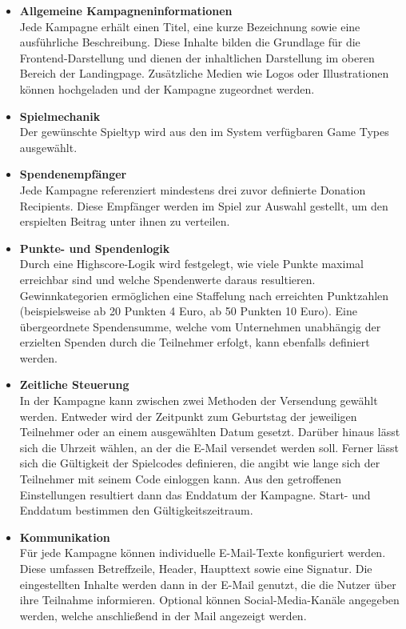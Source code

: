 \begin{itemize}
\item \textbf{Allgemeine Kampagneninformationen} \\
Jede Kampagne erhält einen Titel, eine kurze Bezeichnung sowie eine ausführliche Beschreibung.
Diese Inhalte bilden die Grundlage für die Frontend-Darstellung und dienen der inhaltlichen Darstellung im oberen Bereich der Landingpage.
Zusätzliche Medien wie Logos oder Illustrationen können hochgeladen und der Kampagne zugeordnet werden.

\item \textbf{Spielmechanik} \\
Der gewünschte Spieltyp wird aus den im System verfügbaren Game Types ausgewählt.

\item \textbf{Spendenempfänger} \\
Jede Kampagne referenziert mindestens drei zuvor definierte Donation Recipients.
Diese Empfänger werden im Spiel zur Auswahl gestellt, um den erspielten Beitrag unter ihnen zu verteilen.

\item \textbf{Punkte- und Spendenlogik} \\
Durch eine Highscore-Logik wird festgelegt, wie viele Punkte maximal erreichbar sind und welche Spendenwerte daraus resultieren.
Gewinnkategorien ermöglichen eine Staffelung nach erreichten Punktzahlen (beispielsweise ab 20 Punkten 4 Euro, ab 50 Punkten 10 Euro).
Eine übergeordnete Spendensumme, welche vom Unternehmen unabhängig der erzielten Spenden durch die Teilnehmer erfolgt, kann ebenfalls definiert werden.

\item \textbf{Zeitliche Steuerung} \\
In der Kampagne kann zwischen zwei Methoden der Versendung gewählt werden.
Entweder wird der Zeitpunkt zum Geburtstag der jeweiligen Teilnehmer oder an einem ausgewählten Datum gesetzt.
Darüber hinaus lässt sich die Uhrzeit wählen, an der die E-Mail versendet werden soll.
Ferner lässt sich die Gültigkeit der Spielcodes definieren, die angibt wie lange sich der Teilnehmer mit seinem Code einloggen kann.
Aus den getroffenen Einstellungen resultiert dann das Enddatum der Kampagne.
Start- und Enddatum bestimmen den Gültigkeitszeitraum.

\item \textbf{Kommunikation} \\
Für jede Kampagne können individuelle E-Mail-Texte konfiguriert werden.
Diese umfassen Betreffzeile, Header, Haupttext sowie eine Signatur.
Die eingestellten Inhalte werden dann in der E-Mail genutzt, die die Nutzer über ihre Teilnahme informieren.
Optional können Social-Media-Kanäle angegeben werden, welche anschließend in der Mail angezeigt werden.


\end{itemize}
